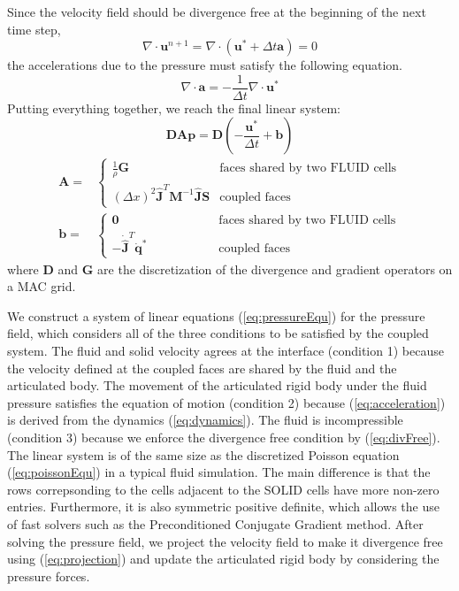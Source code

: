 Since the velocity field should be divergence free at the beginning of the next time step,
\begin{equation}
\label{eq:divFree}
\nabla\cdot\mathbf{u}^{n+1}=\nabla\cdot(\mathbf{u}^*+\Delta t\mathbf{a})=0
\end{equation}
the accelerations due to the pressure must satisfy the following equation.
\begin{displaymath}
\nabla\cdot\mathbf{a}=-\frac{1}{\Delta t}\nabla\cdot\mathbf{u}^*
\end{displaymath}
Putting everything together, we reach the final linear system:
\begin{equation}
\label{eq:pressureEqu}
\mathbf{D}\mathbf{A}\mathbf{p}=\mathbf{D}(-\frac{\mathbf{u}^*}{\Delta t}+\mathbf{b})
\end{equation}
\begin{displaymath}
\begin{array}{ll}
\mathbf{A} = & \left\{ \begin{array}{ll}
\frac{1}{\rho}\mathbf{G} & \textrm{faces shared by two FLUID cells}\\
(\Delta x)^2\hat{\mathbf{J}}^T\mathbf{M}^{-1}\hat{\mathbf{J}}\mathbf{S} & \textrm{coupled faces}
\end{array} \right. \\
\mathbf{b} = & \left\{ \begin{array}{ll}
\mathbf{0} & \textrm{~~~~~~~~~~~~~~~faces shared by two FLUID cells} \\
-\dot{\hat{\mathbf{J}}}^T\mathbf{\dot{q}}^* & \textrm{~~~~~~~~~~~~~~~coupled faces}
\end{array} \right.
\end{array}
\end{displaymath}
where $\mathbf{D}$ and $\mathbf{G}$ are the discretization of the divergence and gradient operators on a MAC grid.

We construct a system of linear equations (\ref{eq:pressureEqu}) for the
pressure field, which considers all of the three conditions to be
satisfied by the coupled system. The fluid and solid velocity agrees at
the interface (condition 1) because the velocity defined at the coupled
faces are shared by the fluid and the articulated body. The movement of
the articulated rigid body under the fluid pressure satisfies the equation
of motion (condition 2) because (\ref{eq:acceleration}) is derived from
the dynamics (\ref{eq:dynamics}). The fluid is incompressible
(condition 3) because we enforce the divergence free condition by
(\ref{eq:divFree}). The linear system is of the same size as the
discretized Poisson equation (\ref{eq:poissonEqu}) in a typical fluid
simulation.  The main difference is that the rows correpsonding to the
cells adjacent to the SOLID cells have more non-zero entries. Furthermore,
it is also symmetric positive definite, which allows the use of fast
solvers such as the Preconditioned Conjugate Gradient method. After
solving the pressure field, we project the velocity field to make it divergence free
using (\ref{eq:projection}) and update the articulated rigid body by
considering the pressure forces.

